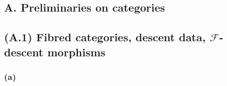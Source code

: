 \documentclass{article}
\theoremstyle{definition}
\theoremstyle{definition}
\theoremstyle{definition}
\theoremstyle{definition}
\theoremstyle{remark}
\begin{document}
\hypertarget{a.-preliminaries-on-categories}{%
\subsection*{\texorpdfstring{\textbf{A.} Preliminaries on categories}{A. Preliminaries on categories}}\label{a.-preliminaries-on-categories}}

\hypertarget{fga-3-i-section-A.1}{%
\subsection{\texorpdfstring{(A.1) Fibred categories, descent data, \({\mathcal{F}}\)-descent morphisms}{(A.1) Fibred categories, descent data, \{\textbackslash mathcal\{F\}\}-descent morphisms}}\label{fga-3-i-section-A.1}}

\hypertarget{fga-3-i-section-A.1.a}{%
\subsubsection{(a)}\label{fga-3-i-section-A.1.a}}
\end{document}

